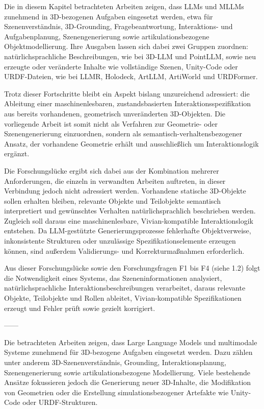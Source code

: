 Die in diesem Kapitel betrachteten Arbeiten zeigen, dass LLMs und MLLMs
zunehmend in 3D-bezogenen Aufgaben eingesetzt werden, etwa für
Szenenverständnis, 3D-Grounding, Fragebeantwortung, Interaktions- und
Aufgabenplanung, Szenengenerierung sowie artikulationsbezogene
Objektmodellierung. Ihre Ausgaben lassen sich dabei zwei Gruppen zuordnen:
natürlichsprachliche Beschreibungen, wie bei 3D-LLM und PointLLM, sowie neu
erzeugte oder veränderte Inhalte wie vollständige Szenen, Unity-Code oder
URDF-Dateien, wie bei LLMR, Holodeck, ArtLLM, ArtiWorld und URDFormer.

Trotz dieser Fortschritte bleibt ein Aspekt bislang unzureichend adressiert:
die Ableitung einer maschinenlesbaren, zustandsbasierten
Interaktionsspezifikation aus bereits vorhandenen, geometrisch unveränderten
3D-Objekten. Die vorliegende Arbeit ist somit nicht als Verfahren zur
Geometrie- oder Szenengenerierung einzuordnen, sondern als
semantisch-verhaltensbezogener Ansatz, der vorhandene Geometrie erhält und
ausschließlich um Interaktionslogik ergänzt.

Die Forschungslücke ergibt sich dabei aus der Kombination mehrerer
Anforderungen, die einzeln in verwandten Arbeiten auftreten, in dieser
Verbindung jedoch nicht adressiert werden. Vorhandene statische 3D-Objekte
sollen erhalten bleiben, relevante Objekte und Teilobjekte semantisch
interpretiert und gewünschtes Verhalten natürlichsprachlich beschrieben
werden. Zugleich soll daraus eine maschinenlesbare, Vivian-kompatible
Interaktionslogik entstehen. Da LLM-gestützte Generierungsprozesse
fehlerhafte Objektverweise, inkonsistente Strukturen oder unzulässige
Spezifikationselemente erzeugen können, sind außerdem Validierungs- und
Korrekturmaßnahmen erforderlich.

Aus dieser Forschungslücke sowie den Forschungsfragen F1 bis F4 (siehe 1.2)
folgt die Notwendigkeit eines Systems, das Szeneninformationen analysiert,
natürlichsprachliche Interaktionsbeschreibungen verarbeitet, daraus relevante
Objekte, Teilobjekte und Rollen ableitet, Vivian-kompatible Spezifikationen
erzeugt und Fehler prüft sowie gezielt korrigiert.

------

Die betrachteten Arbeiten zeigen, dass Large Language Models und multimodale Systeme zunehmend für 3D-bezogene Aufgaben eingesetzt werden. Dazu zählen unter anderem 3D-Szenenverständnis, Grounding, Interaktionsplanung, Szenengenerierung sowie artikulationsbezogene Modellierung. Viele bestehende Ansätze fokussieren jedoch die Generierung neuer 3D-Inhalte, die Modifikation von Geometrien oder die Erstellung simulationsbezogener Artefakte wie Unity-Code oder URDF-Strukturen.

